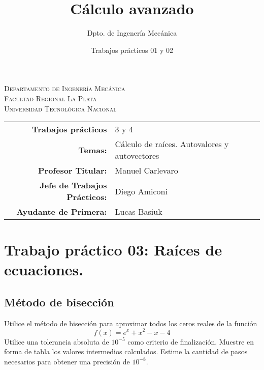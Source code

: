 \documentclass[11pt]{article}
\title{Cálculo avanzado}
\author{Dpto. de Ingenería Mecánica}
\date{Trabajos prácticos 01 y 02}
\begin{document}

\begin{center}
\end{center} 

\begin{center}
\vspace{\baselineskip}
\Large{\textsc{Departamento de Ingenería Mecánica}} \\
\textsc{Facultad Regional La Plata} \\
\textsc{Universidad Tecnológica Nacional}
\end{center}


\begin{center}
\begin{tabular}{r l}
   \textbf{Trabajos prácticos} & 3 y 4 \\
 \textbf{Temas:} & Cálculo de raíces. Autovalores y autovectores\\
 \textbf{Profesor Titular:} & Manuel Carlevaro \\
 \textbf{Jefe de Trabajos Prácticos:} & Diego Amiconi \\
 \textbf{Ayudante de Primera:} & Lucas Basiuk 
\end{tabular}\end{center}

\vspace{1em}

\section{Trabajo práctico 03: Raíces de ecuaciones.}

\subsection{Método de bisección}
Utilice el método de bisección para aproximar todos los ceros reales de la función
\[ f(x) = e^x + x^2 - x -4 \]
Utilice una tolerancia absoluta de $10^{-5}$ como criterio de finalización. Muestre en forma de tabla los valores intermedios calculados. Estime la cantidad de pasos necesarios para obtener una precisión de $10^{-8}$.
\end{document}
